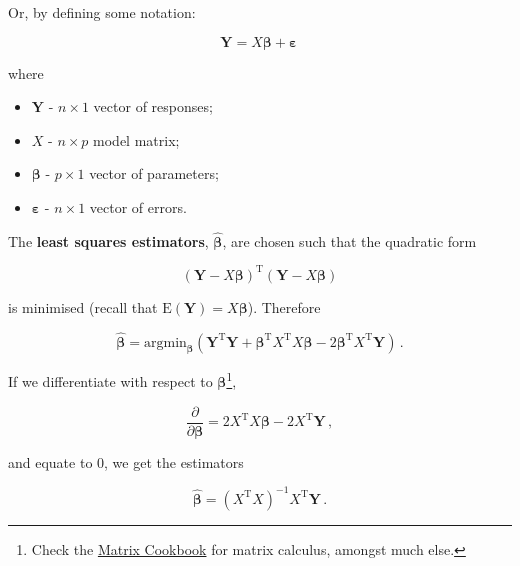 \documentclass[
]{book}
\providecommand{\tightlist}{%
  \setlength{\itemsep}{0pt}\setlength{\parskip}{0pt}}
\theoremstyle{definition}
\theoremstyle{definition}
\theoremstyle{definition}
\theoremstyle{definition}
\theoremstyle{remark}
\begin{document}
Or, by defining some notation:

\begin{equation}
\boldsymbol{Y}=X\boldsymbol{\beta}+\boldsymbol{\varepsilon}\,
\label{eq:matrix-model}
\end{equation}

where

\begin{itemize}
\tightlist
\item
  \(\boldsymbol{Y}\) - \(n\times 1\) vector of responses;
\item
  \(X\) - \(n\times p\) model matrix;
\item
  \(\boldsymbol{\beta}\) - \(p\times 1\) vector of parameters;
\item
  \(\boldsymbol{\varepsilon}\) - \(n\times 1\) vector of errors.
\end{itemize}

The \textbf{least squares estimators}, \(\hat{\boldsymbol{\beta}}\), are chosen such that the quadratic form

\begin{equation*}
(\boldsymbol{Y}-X\boldsymbol{\beta})^{\textrm{T}}(\boldsymbol{Y}-X\boldsymbol{\beta})
\end{equation*}

is minimised (recall that \(\textrm{E}(\textbf{Y})=X\boldsymbol{\beta}\)). Therefore

\begin{equation*}
\hat{\boldsymbol{\beta}} = \textrm{argmin}_{\boldsymbol{\beta}}(\boldsymbol{Y}^{\textrm{T}}\boldsymbol{Y}+\boldsymbol{\beta}^{\textrm{T}}X^{\textrm{T}}X\boldsymbol{\beta}
-2\boldsymbol{\beta}^{\textrm{T}}X^{\textrm{T}}\boldsymbol{Y})\,.
\end{equation*}

If we differentiate with respect to \(\boldsymbol{\beta}\)\footnote{Check the \href{https://www.math.uwaterloo.ca/~hwolkowi/matrixcookbook.pdf}{Matrix Cookbook} for matrix calculus, amongst much else.},

\begin{equation*}
\frac{\partial}{\partial\boldsymbol{\beta}}=2X^{\textrm{T}}X\boldsymbol{\beta}-2X^{\textrm{T}}\boldsymbol{Y}\,,\nonumber
\end{equation*}

and equate to 0, we get the estimators

\begin{equation}
\hat{\boldsymbol{\beta}}=(X^{\textrm{T}}X)^{-1}X^{\textrm{T}}\boldsymbol{Y}\,.
\label{eq:lsestimators}
\end{equation}
\end{document}
